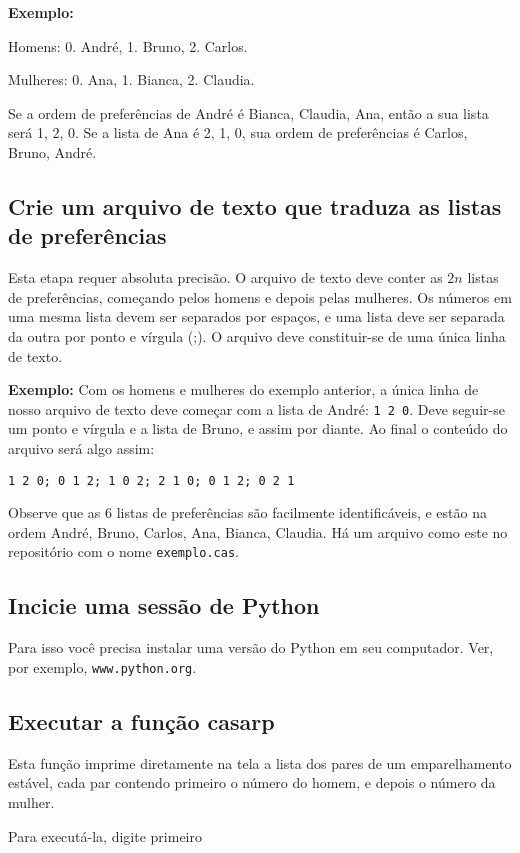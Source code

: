\documentclass[11pt]{article}
\begin{document}
{\bf Exemplo:} 

Homens: 0. André, 1. Bruno, 2. Carlos. 

Mulheres: 0. Ana, 1. Bianca, 2. Claudia. 

Se a ordem de preferências de André é Bianca, Claudia, Ana, então a sua
lista será 1, 2, 0. Se a lista de Ana é 2, 1, 0, sua ordem de preferências é Carlos,
Bruno, André.

\subsection{Crie um arquivo de texto que traduza as listas de preferências}
\label{sec-3-2}

Esta etapa requer absoluta precisão. O arquivo de texto deve conter as $2n$ listas de
preferências, começando pelos homens e depois pelas mulheres. Os números em uma mesma
lista devem ser separados por espaços, e uma lista deve ser separada da outra por
ponto e vírgula (;). O arquivo deve constituir-se de uma única linha de texto.

{\bf Exemplo:} Com os homens e mulheres do exemplo anterior, a única linha
de nosso arquivo de texto deve começar com a lista de André: \verb|1 2 0|. Deve
seguir-se um ponto e vírgula e a lista de Bruno, e assim por diante. Ao final o
conteúdo do arquivo será algo assim:

\verb|1 2 0; 0 1 2; 1 0 2; 2 1 0; 0 1 2; 0 2 1|

Observe que as $6$ listas de preferências são facilmente identificáveis, e estão
na ordem André, Bruno, Carlos, Ana, Bianca, Claudia. Há um arquivo como este no
repositório com o nome \verb|exemplo.cas|.
\subsection{Incicie uma sessão de Python}
\label{sec-3-3}

Para isso você precisa instalar uma versão do Python em seu computador. Ver, 
por exemplo, \verb|www.python.org|.

\subsection{Executar a função casarp}
\label{sec-3-4}

Esta função imprime diretamente na tela a lista dos pares de um emparelhamento
estável, cada par contendo primeiro o número do homem, e depois o número da mulher.

Para executá-la, digite primeiro
\end{document}
